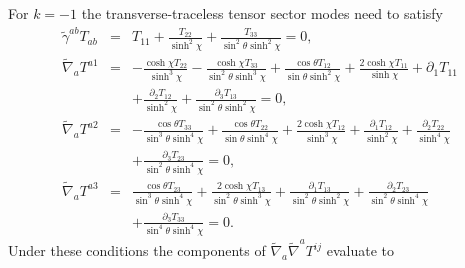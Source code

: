 For $k=-1$ the transverse-traceless tensor sector modes need to satisfy 
%
\begin{eqnarray}
\tilde{\gamma}^{ab}T_{ab}&=& T_{11} + \frac{T_{22}}{\sinh^2\chi} + \frac{T_{33}}{\sin^2\theta \sinh^2\chi} =0,
\nonumber\\
\tilde\nabla_a T^{a 1}&=& - \frac{\cosh\chi T_{22}}{\sinh^3\chi} -  \frac{\cosh\chi T_{33}}{\sin^2\theta \sinh^3\chi} + \frac{\cos\theta T_{12}}{\sin\theta \sinh^2\chi} + \frac{2 \cosh\chi T_{11}}{\sinh\chi} + \partial_{1}T_{11} 
\nonumber\\
&&+ \frac{\partial_{2}T_{12}}{\sinh^2\chi}  + \frac{\partial_{3}T_{13}}{\sin^2\theta \sinh^2\chi}=0, \nonumber\\
\tilde\nabla_a T^{a 2}&=& - \frac{\cos\theta T_{33}}{\sin^3\theta \sinh^4\chi} + \frac{\cos\theta T_{22}}{\sin\theta \sinh^4\chi} + \frac{2 \cosh\chi T_{12}}{\sinh^3\chi} + \frac{\partial_{1}T_{12}}{\sinh^2\chi} + \frac{\partial_{2}T_{22}}{\sinh^4\chi} 
\nonumber\\
&&+ \frac{\partial_{3}T_{23}}{\sin^2\theta \sinh^4\chi}=0,
\nonumber\\
\tilde\nabla_a T^{a 3}&=& \frac{\cos\theta T_{23}}{\sin^3\theta \sinh^4\chi} + \frac{2 \cosh\chi T_{13}}{\sin^2\theta \sinh^3\chi} + \frac{\partial_{1}T_{13}}{\sin^2\theta \sinh^2\chi} + \frac{\partial_{2}T_{23}}{\sin^2\theta \sinh^4\chi}
\nonumber\\
&& + \frac{\partial_{3}T_{33}}{\sin^4\theta \sinh^4\chi}=0.
\label{10.31b}
\end{eqnarray}
%
Under these conditions the components of $\tilde{\nabla}_a\tilde{\nabla}^aT^{ij}$ evaluate to
%
